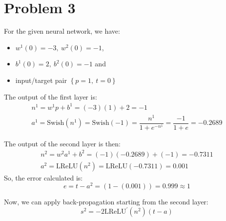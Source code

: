 \section{Problem 3}

For the given neural network, we have:
\begin{itemize}
	\item $w^1\left(0\right) = -3,\ w^2\left(0\right) = -1$,
	\item $b^1\left(0\right) = 2,\ b^2\left(0\right) = -1$ and
	\item input/target pair $\left\{p=1,\ t=0\right\}$
\end{itemize}
\vspace*{1mm}
The output of the first layer is:
\[
\begin{gathered}
n^1 = w^1 p + b^1 = (-3)(1) + 2 = -1\\
a^1 = \text{Swish}\left(n^1\right) = \text{Swish}\left(-1\right) = \dfrac{n^1}{1+e^{-n^1}} = \dfrac{-1}{1+e} = -0.2689
\end{gathered}
\]

The output of the second layer is then:
\[
\begin{gathered}
n^2 = w^2 a^1 + b^2 = (-1)(-0.2689) + (-1) = -0.7311 \\ 
a^2 = \text{LReLU}\left(n^2\right) = \text{LReLU}\left(-0.7311\right) = 0.001
\end{gathered}
\]
So, the error calculated is:
\[
e = t-a^2 = \left(1-\left(0.001\right)\right) = 0.999 \approx 1
\]

Now, we can apply back-propagation starting from the second layer:
\[
s^2 = -2 \text{LReLU}^{'}\left(n^2\right)\left(t-a\right)
\]